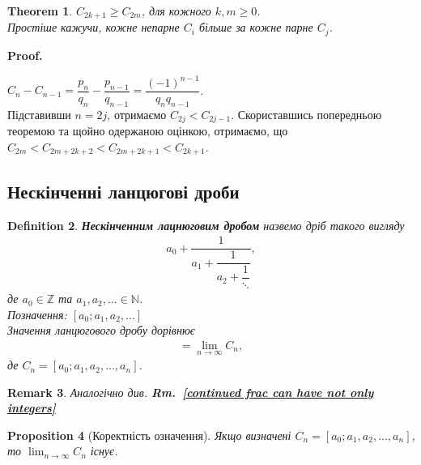 \documentclass[a4paper, 14pt]{extarticle}
\makeatletter
\theoremstyle{theoremdd}
\newtheorem{theorem}{Theorem}[subsection]
\theoremstyle{theoremdd}
\newtheorem{definition}[theorem]{Definition}
\theoremstyle{theoremdd}
\theoremstyle{theoremdd}
\theoremstyle{theoremdd}
\newtheorem{proposition}[theorem]{Proposition}
\theoremstyle{theoremdd}
\newtheorem{remark}[theorem]{Remark}
\theoremstyle{theoremdd}
\theoremstyle{theoremdd}
\def\qed{$\blacksquare$}
\renewenvironment{proof}[1][Proof.\\]{\par
\pushQED{\hfill \qed}%
\normalfont \topsep6\p@\@plus6\p@\relax
\trivlist
\item\relax
{\bfseries
#1\@addpunct{.}}\hspace\labelsep\ignorespaces
}{%
\popQED\endtrivlist\@endpefalse
}
\newcommand\rmref[1]{\textbf{Rm.~\ref{#1}}}
\makeatother
\begin{document}
\begin{theorem}
$C_{2k+1} \geq C_{2m}$, для кожного $k,m \geq 0$. \\
Простіше кажучи, кожне непарне $C_i$ більше за кожне парне $C_j$.
\end{theorem}

\begin{proof}
$C_n - C_{n-1} = \dfrac{p_n}{q_n} - \dfrac{p_{n-1}}{q_{n-1}} = \dfrac{(-1)^{n-1}}{q_nq_{n-1}}$.\\
Підставивши $n = 2j$, отримаємо $C_{2j} < C_{2j-1}$. Скориставшись попередньою теоремою та щойно одержаною оцінкою, отримаємо, що\\
$C_{2m} < C_{2m + 2k + 2} < C_{2m + 2k + 1} < C_{2k+1}$.
\end{proof}

\subsection{Нескінченні ланцюгові дроби}
\begin{definition}
\textbf{Нескінченним лацнюговим дробом} назвемо дріб такого вигляду
\begin{align*}
a_0 + \dfrac{1}{a_1 + \dfrac{1}{a_2 + \dfrac{1}{\ddots }}},
\end{align*}
де $a_0 \in \mathbb{Z}$ та $a_1,a_2,\dots \in \mathbb{N}$.\\
Позначення: $[a_0;a_1,a_2,\dots]$\\
Значення ланцюгового дробу дорівнює
\begin{align*}
[a_0;a_1,a_2,\dots] = \lim_{n \to \infty} C_n,
\end{align*}
де $C_n = [a_0;a_1,a_2,\dots,a_n]$.
\end{definition}

\begin{remark}
Аналогічно див. \rmref{continued frac can have not only integers}
\end{remark}

\begin{proposition}[Коректність означення]
Якщо визначені $C_n = [a_0;a_1,a_2,\dots,a_n]$, то $\displaystyle\lim_{n \to \infty} C_n$ існує.
\end{proposition}
\end{document}
